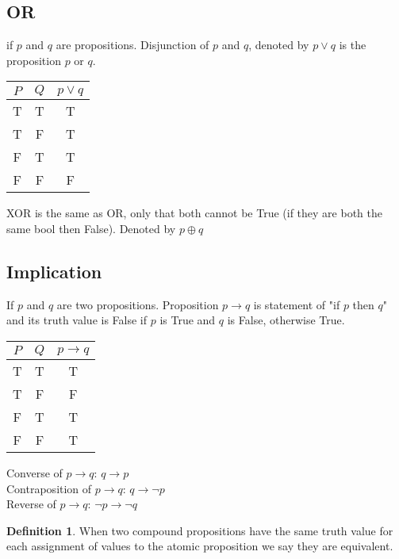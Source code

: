 \documentclass[11pt]{article}
\theoremstyle{definition}
\newtheorem{defn}{Definition}
\begin{document}
\subsection{OR}
if $p$ and $q$ are propositions. Disjunction of $p$ and $q$, denoted by $p \lor q$ is the proposition $p$ or $q$.
\begin{center}
	\begin{tabular}{ |c|c|c| } 
 		\hline
 		$P$ & $Q$ & $p \lor q$\\
		\hline
 		T & T  & T\\
 		T & F & T\\
		F & T & T\\
		F & F & F \\
 		\hline
	\end{tabular}
\end{center}

XOR is the same as OR, only that both cannot be True (if they are both the same bool then False). Denoted by $p \oplus q$

\subsection{Implication}
If $p$ and $q$ are two propositions. Proposition $p \rightarrow q$ is statement of "if $p$ then $q$" and its truth value is False if $p$ is True and $q$ is False, otherwise True.
\begin{center}
	\begin{tabular}{ |c|c|c|} 
 		\hline
 		$P$ & $Q$ & $p \rightarrow q$  \\
		\hline
 		T & T  & T \\
 		T & F & F \\
		F & T & T \\
		F & F & T \\
 		\hline
	\end{tabular}
\end{center}
Converse of $p \rightarrow q$: $q \rightarrow p$ \\
Contraposition of $p \rightarrow q$: $q \rightarrow \neg p$ \\
Reverse of $p \rightarrow q$: $\neg p \rightarrow \neg q$

\begin{defn}
When two compound propositions have the same truth value for each assignment of values to the atomic proposition we say they are equivalent. 
\end{defn}
\end{document}

